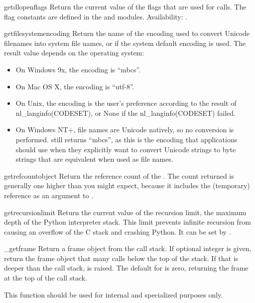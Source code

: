 \begin{funcdesc}{getdlopenflags}{}
  Return the current value of the flags that are used for
   calls. The flag constants are defined in the
   and  modules.
  Availability: \UNIX.
\end{funcdesc}

\begin{funcdesc}{getfilesystemencoding}{}
  Return the name of the encoding used to convert Unicode filenames
  into system file names, or  if the system default encoding
  is used. The result value depends on the operating system:
\begin{itemize}
\item On Windows 9x, the encoding is ``mbcs''.
\item On Mac OS X, the encoding is ``utf-8''.
\item On Unix, the encoding is the user's preference 
      according to the result of nl_langinfo(CODESET), or None if
      the nl_langinfo(CODESET) failed.
\item On Windows NT+, file names are Unicode natively, so no conversion
      is performed.  still returns ``mbcs'',
      as this is the encoding that applications should use when they
      explicitly want to convert Unicode strings to byte strings that
      are equivalent when used as file names.
\end{itemize}
\end{funcdesc}

\begin{funcdesc}{getrefcount}{object}
  Return the reference count of the .  The count returned
  is generally one higher than you might expect, because it includes
  the (temporary) reference as an argument to
  .
\end{funcdesc}

\begin{funcdesc}{getrecursionlimit}{}
  Return the current value of the recursion limit, the maximum depth
  of the Python interpreter stack.  This limit prevents infinite
  recursion from causing an overflow of the C stack and crashing
  Python.  It can be set by .
\end{funcdesc}

\begin{funcdesc}{_getframe}{}
  Return a frame object from the call stack.  If optional integer
   is given, return the frame object that many calls below
  the top of the stack.  If that is deeper than the call stack,
   is raised.  The default for  is
  zero, returning the frame at the top of the call stack.

  This function should be used for internal and specialized purposes
  only.
\end{funcdesc}

